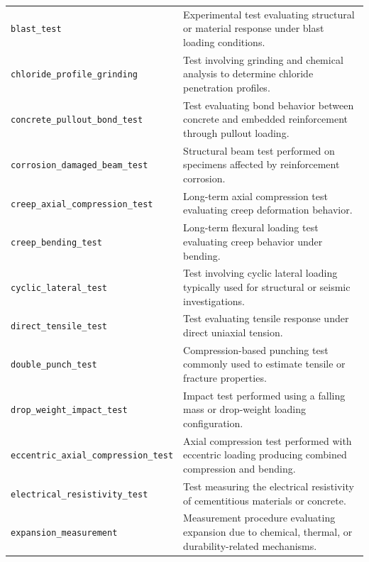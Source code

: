 \documentclass[11pt]{book}
\begin{document}
{\begin{longtable}{p{}p{}}
\texttt{blast\_test} &
Experimental test evaluating structural or material response under blast loading conditions. \\

\texttt{chloride\_profile\_grinding} &
Test involving grinding and chemical analysis to determine chloride penetration profiles. \\

\texttt{concrete\_pullout\_bond\_test} &
Test evaluating bond behavior between concrete and embedded reinforcement through pullout loading. \\

\texttt{corrosion\_damaged\_beam\_test} &
Structural beam test performed on specimens affected by reinforcement corrosion. \\

\texttt{creep\_axial\_compression\_test} &
Long-term axial compression test evaluating creep deformation behavior. \\

\texttt{creep\_bending\_test} &
Long-term flexural loading test evaluating creep behavior under bending. \\

\texttt{cyclic\_lateral\_test} &
Test involving cyclic lateral loading typically used for structural or seismic investigations. \\

\texttt{direct\_tensile\_test} &
Test evaluating tensile response under direct uniaxial tension. \\

\texttt{double\_punch\_test} &
Compression-based punching test commonly used to estimate tensile or fracture properties. \\

\texttt{drop\_weight\_impact\_test} &
Impact test performed using a falling mass or drop-weight loading configuration. \\

\texttt{eccentric\_axial\_compression\_test} &
Axial compression test performed with eccentric loading producing combined compression and bending. \\

\texttt{electrical\_resistivity\_test} &
Test measuring the electrical resistivity of cementitious materials or concrete. \\

\texttt{expansion\_measurement} &
Measurement procedure evaluating expansion due to chemical, thermal, or durability-related mechanisms. \\


\end{longtable}}
\end{document}

